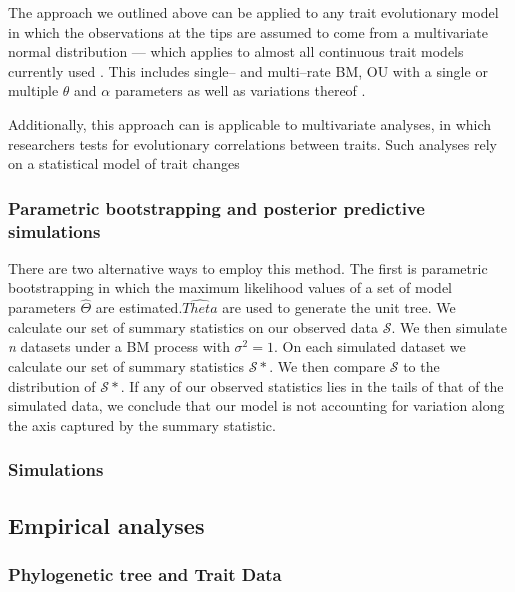 \documentclass[12pt]{article}
\begin{document}
The approach we outlined above can be applied to any trait evolutionary model in which the observations at the tips are assumed to come from a multivariate normal distribution --- which applies to almost all continuous trait models currently used \citep{Omeara2012}. This includes single-- and multi--rate BM, OU with a single or multiple $\theta$ and $\alpha$ parameters as well as variations thereof \citep[see][for an example of an evolutionary model for which this does not hold]{Landis2012}.

Additionally, this approach can is applicable to multivariate analyses, in which researchers tests for evolutionary correlations between traits. Such analyses rely on a statistical model of trait changes 

\subsubsection{Parametric bootstrapping and posterior predictive simulations}

There are two alternative ways to employ this method. The first is parametric bootstrapping in which the maximum likelihood values of a set of model parameters $\hat{\Theta}$ are estimated.$\hat{Theta}$ are used to generate the unit tree. We calculate our set of summary statistics on our observed data $\mathcal{S}$. We then simulate \textit{n} datasets under a BM process with $\sigma^2 = 1$. On each simulated dataset we calculate our set of summary statistics $\mathcal{S}*$. We then compare $\mathcal{S}$ to the distribution of $\mathcal{S}*$. If any of our observed statistics lies in the tails of that of the simulated data, we conclude that our model is not accounting for variation along the axis captured by the summary statistic. 

\subsubsection{Simulations}


\subsection{Empirical analyses}

\subsubsection{Phylogenetic tree and Trait Data}
\end{document}
